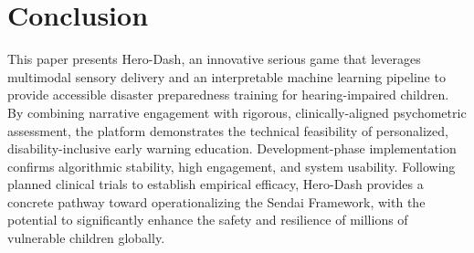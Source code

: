 \documentclass[conference]{IEEEtran}
\begin{document}
\section{Conclusion}

This paper presents Hero-Dash, an innovative serious game that leverages multimodal sensory delivery and an interpretable machine learning pipeline to provide accessible disaster preparedness training for hearing-impaired children. By combining narrative engagement with rigorous, clinically-aligned psychometric assessment, the platform demonstrates the technical feasibility of personalized, disability-inclusive early warning education. Development-phase implementation confirms algorithmic stability, high engagement, and system usability. Following planned clinical trials to establish empirical efficacy, Hero-Dash provides a concrete pathway toward operationalizing the Sendai Framework, with the potential to significantly enhance the safety and resilience of millions of vulnerable children globally.
\end{document}

